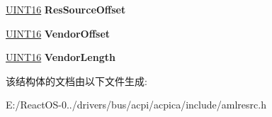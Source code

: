 \begin{DoxyCompactItemize}
\item 
\mbox{\label{structaml__resource__pin__config_aab99f6beba23b9825e6ce29270267ade}} 
\hyperlink{_processor_bind_8h_a09f1a1fb2293e33483cc8d44aefb1eb1}{U\+I\+N\+T16} {\bfseries Res\+Source\+Offset}
\item 
\mbox{\label{structaml__resource__pin__config_a29b9a748471e417f8ede11ee639ad0c1}} 
\hyperlink{_processor_bind_8h_a09f1a1fb2293e33483cc8d44aefb1eb1}{U\+I\+N\+T16} {\bfseries Vendor\+Offset}
\item 
\mbox{\label{structaml__resource__pin__config_a446d316c68a5a6f5295ea781bd7d4651}} 
\hyperlink{_processor_bind_8h_a09f1a1fb2293e33483cc8d44aefb1eb1}{U\+I\+N\+T16} {\bfseries Vendor\+Length}
\end{DoxyCompactItemize}


该结构体的文档由以下文件生成\+:\begin{DoxyCompactItemize}
\item 
E\+:/\+React\+O\+S-\/0../drivers/bus/acpi/acpica/include/amlresrc.\+h\end{DoxyCompactItemize}
